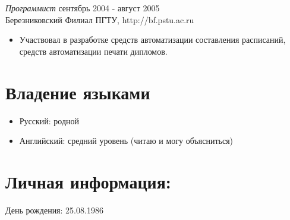 \documentclass[12pt]{res} %
\begin{document}
\begin{resume}
{\sl Программист} \hfill сентябрь 2004 - август 2005 \\
Березниковский Филиал ПГТУ, http://bf.pstu.ac.ru
\begin{itemize}
\item Участвовал в разработке средств автоматизации составления расписаний, средств автоматизации печати дипломов.
\end{itemize} 

\section{Владение языками}
\begin{itemize}
\item Русский: родной
\item Английский: средний уровень (читаю и могу объясниться)
\end{itemize}

\section{Личная информация:}
День рождения: 25.08.1986

\end{resume}
\end{document}
